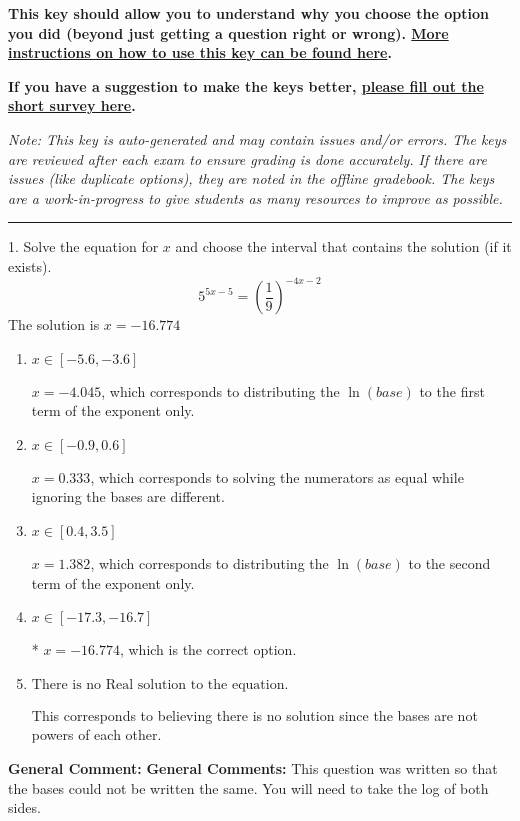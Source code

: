 \documentclass{extbook}[14pt]
\begin{document}
\textbf{This key should allow you to understand why you choose the option you did (beyond just getting a question right or wrong). \href{https://xronos.clas.ufl.edu/mac1105spring2020/courseDescriptionAndMisc/Exams/LearningFromResults}{More instructions on how to use this key can be found here}.}

\textbf{If you have a suggestion to make the keys better, \href{https://forms.gle/CZkbZmPbC9XALEE88}{please fill out the short survey here}.}

\textit{Note: This key is auto-generated and may contain issues and/or errors. The keys are reviewed after each exam to ensure grading is done accurately. If there are issues (like duplicate options), they are noted in the offline gradebook. The keys are a work-in-progress to give students as many resources to improve as possible.}

\rule{\textwidth}{0.4pt}

1. Solve the equation for $x$ and choose the interval that contains the solution (if it exists).
\[ 5^{5x-5} = \left(\frac{1}{9}\right)^{-4x-2} \] 
The solution is $ x = -16.774 $ 

\begin{enumerate}[label=\Alph*.] 
\item $ x \in [-5.6, -3.6] $ 

 $x = -4.045$, which corresponds to distributing the $\ln(base)$ to the first term of the exponent only. 
\item $ x \in [-0.9, 0.6] $ 

 $x = 0.333$, which corresponds to solving the numerators as equal while ignoring the bases are different. 
\item $ x \in [0.4, 3.5] $ 

 $x = 1.382$, which corresponds to distributing the $\ln(base)$ to the second term of the exponent only. 
\item $ x \in [-17.3, -16.7] $ 

 * $x = -16.774$, which is the correct option. 
\item $ \text{There is no Real solution to the equation.} $ 

 This corresponds to believing there is no solution since the bases are not powers of each other. 
\end{enumerate} 
 
\textbf{General Comment:} \textbf{General Comments:} This question was written so that the bases could not be written the same. You will need to take the log of both sides. 
\end{document}
